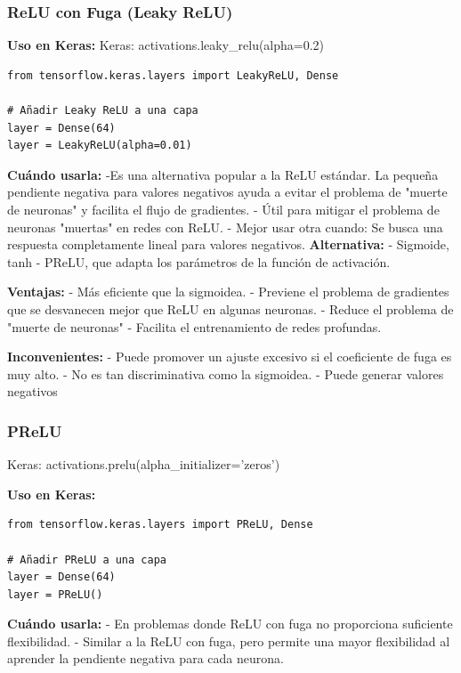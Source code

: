 \documentclass[11pt]{article}
\begin{document}
\subsubsection{ReLU con Fuga (Leaky ReLU)}
\label{sec:orgc017dd1}
\textbf{Uso en Keras:} Keras: activations.leaky\_relu(alpha=0.2)

\begin{verbatim}
from tensorflow.keras.layers import LeakyReLU, Dense

# Añadir Leaky ReLU a una capa
layer = Dense(64)
layer = LeakyReLU(alpha=0.01)
\end{verbatim}

\textbf{Cuándo usarla:} -Es una alternativa popular a la ReLU estándar. La
pequeña pendiente negativa para valores negativos ayuda a evitar el
problema de "muerte de neuronas" y facilita el flujo de gradientes. -
Útil para mitigar el problema de neuronas "muertas" en redes con ReLU. -
Mejor usar otra cuando: Se busca una respuesta completamente lineal para
valores negativos. \textbf{Alternativa:} - Sigmoide, tanh - PReLU, que adapta
los parámetros de la función de activación.

\textbf{Ventajas:} - Más eficiente que la sigmoidea. - Previene el problema de
gradientes que se desvanecen mejor que ReLU en algunas neuronas. -
Reduce el problema de "muerte de neuronas" - Facilita el entrenamiento
de redes profundas.

\textbf{Inconvenientes:} - Puede promover un ajuste excesivo si el coeficiente
de fuga es muy alto. - No es tan discriminativa como la sigmoidea. -
Puede generar valores negativos

\subsubsection{PReLU}
\label{sec:orgb6f80db}
Keras: activations.prelu(alpha\_initializer='zeros')

\textbf{Uso en Keras:}

\begin{verbatim}
from tensorflow.keras.layers import PReLU, Dense

# Añadir PReLU a una capa
layer = Dense(64)
layer = PReLU()
\end{verbatim}

\textbf{Cuándo usarla:} - En problemas donde ReLU con fuga no proporciona
suficiente flexibilidad. - Similar a la ReLU con fuga, pero permite una
mayor flexibilidad al aprender la pendiente negativa para cada neurona.
\end{document}
